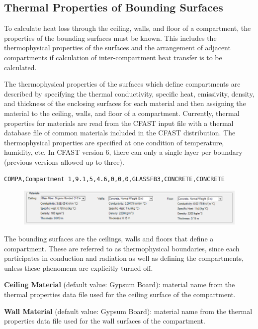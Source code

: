 \subsection{Thermal Properties of Bounding Surfaces}

To calculate heat loss through the ceiling, walls, and floor of a compartment, the properties of the bounding surfaces must be known. This includes the thermophysical properties of the surfaces and the arrangement of adjacent compartments if calculation of inter-compartment heat transfer is to be calculated.

The thermophysical properties of the surfaces which define compartments are described by specifying the thermal conductivity, specific heat, emissivity, density, and thickness of the enclosing surfaces for each material and then assigning the material to the ceiling, walls, and floor of a compartment.  Currently, thermal properties for materials are read from the CFAST input file with a thermal database file of common materials included in the CFAST distribution.  The thermophysical properties are specified at one condition of temperature, humidity, etc.  In CFAST version 6, there can only a single layer per boundary (previous versions allowed up to three).

\begin{lstlisting}
COMPA,Compartment 1,9.1,5,4.6,0,0,0,GLASSFB3,CONCRETE,CONCRETE
\end{lstlisting}

\begin{figure}[h!]
\includegraphics[width=6.5in]{FIGURES/Input_File/Compartment_Materials}
\end{figure}

The bounding surfaces are the ceilings, walls and floors that define a compartment. These are referred to as thermophysical boundaries, since each participates in conduction and radiation as well as defining the compartments, unless these phenomena are explicitly turned off.

\textbf{Ceiling Material} (default value: Gypsum Board): material name from the thermal properties data file used for the ceiling surface of the compartment.

\textbf{Wall Material} (default value: Gypsum Board): material name from the thermal properties data file used for the wall surfaces of the compartment.

